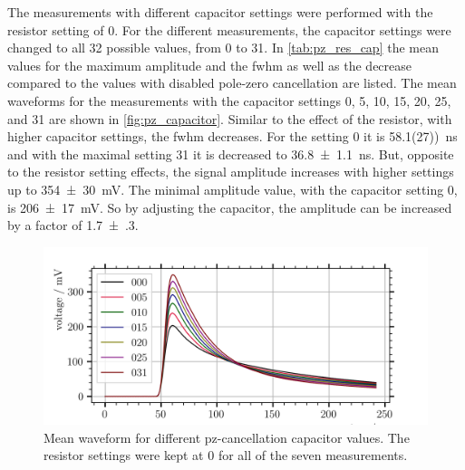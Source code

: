 The measurements with different capacitor settings were performed with the resistor setting of 0.
For the different measurements, the capacitor settings were changed to all 32 possible values, from 0 to 31.
In \autoref{tab:pz_res_cap} the mean values for the maximum amplitude and the \ac{fwhm} as well as the decrease compared to the values with disabled pole-zero cancellation are listed.
The mean waveforms for the measurements with the capacitor settings 0, 5, 10, 15, 20, 25, and 31 are shown in \autoref{fig:pz_capacitor}.
Similar to the effect of the resistor, with higher capacitor settings, the \ac{fwhm} decreases.
For the setting 0 it is \SI{58.1(27))}{\nano\second} and with the maximal setting 31 it is decreased to \SI{36.8(11)}{\nano\second}.
But, opposite to the resistor setting effects, the signal amplitude increases with higher settings up to \SI{354(30)}{\milli\volt}.
The minimal amplitude value, with the capacitor setting 0, is \SI{206(17)}{\milli\volt}.
So by adjusting the capacitor, the amplitude can be increased by a factor of \num{1.7(3)}.
\begin{figure}
	\centering
	\includegraphics[width=1.\textwidth]{pictures/pz_capacitor}
	\caption[Mean waveform for different pz-cancellation capacitor values.]{Mean waveform for different pz-cancellation capacitor values. The resistor settings were kept at 0 for all of the seven measurements.}
	\label{fig:pz_capacitor}
\end{figure}

